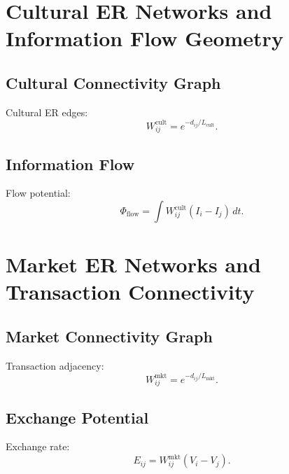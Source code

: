 

\chapter{Cultural ER Networks and Information Flow Geometry}

\section{Cultural Connectivity Graph}
Cultural ER edges:
\[
W_{ij}^{\mathrm{cult}} = e^{-d_{ij}/L_{\mathrm{cult}}}.
\]

\section{Information Flow}
Flow potential:
\[
\Phi_{\mathrm{flow}} = \int W^{\mathrm{cult}}_{ij}(I_i - I_j)\,dt.
\]



\chapter{Market ER Networks and Transaction Connectivity}

\section{Market Connectivity Graph}
Transaction adjacency:
\[
W^{\mathrm{mkt}}_{ij} = e^{-d_{ij}/L_{\mathrm{mkt}}}.
\]

\section{Exchange Potential}
Exchange rate:
\[
E_{ij} = W^{\mathrm{mkt}}_{ij}(V_i - V_j).
\]


